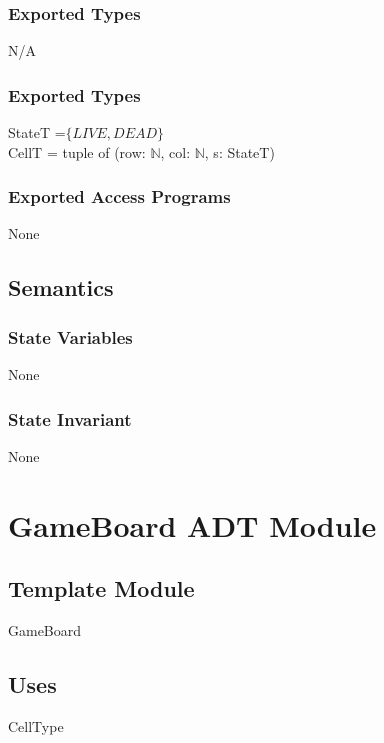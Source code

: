 \documentclass[12pt]{article}
\begin{document}
\subsubsection* {Exported Types}

N/A

\subsubsection* {Exported Types}
StateT =$\{LIVE, DEAD\}$\\
CellT = tuple of (row: $\mathbb{N}$, col: $\mathbb{N}$, s: StateT)

\subsubsection* {Exported Access Programs}

None

\subsection* {Semantics}

\subsubsection* {State Variables}

None

\subsubsection* {State Invariant}

None




\newpage

\section* {GameBoard ADT Module}

\subsection*{Template Module}

GameBoard

\subsection* {Uses}
CellType
\end{document}
